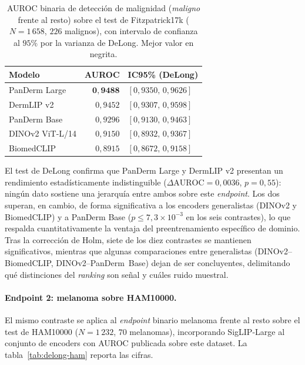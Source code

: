 \begin{table}[htbp]
\centering
\footnotesize
\setlength{\tabcolsep}{4pt}
\renewcommand{\arraystretch}{0.95}
\caption{AUROC binaria de detección de malignidad (\emph{maligno}
frente al resto) sobre el test de Fitzpatrick17k
($N = 1\,658$, $226$ malignos), con intervalo de confianza al
$95\%$ por la varianza de DeLong. Mejor valor en negrita.}
\label{tab:delong-auroc}
\begin{tabular}{lrl}
\hline
Modelo            & AUROC               & IC95\% (DeLong) \\
\hline
PanDerm Large     & $\mathbf{0{,}9488}$ & $[0{,}9350,\, 0{,}9626]$ \\
DermLIP v2        & $0{,}9452$          & $[0{,}9307,\, 0{,}9598]$ \\
PanDerm Base      & $0{,}9296$          & $[0{,}9130,\, 0{,}9463]$ \\
DINOv2 ViT-L/14   & $0{,}9150$          & $[0{,}8932,\, 0{,}9367]$ \\
BiomedCLIP        & $0{,}8915$          & $[0{,}8672,\, 0{,}9158]$ \\
\hline
\end{tabular}
\end{table}

El test de DeLong confirma que PanDerm Large y DermLIP v2 presentan un
rendimiento estadísticamente indistinguible
($\Delta\mathrm{AUROC} = 0{,}0036$, $p = 0{,}55$): ningún dato sostiene
una jerarquía entre ambos sobre este \emph{endpoint}. Los dos superan,
en cambio, de forma significativa a los encoders generalistas (DINOv2
y BiomedCLIP) y a PanDerm Base ($p \leq 7{,}3\times 10^{-3}$ en los
seis contrastes), lo que respalda cuantitativamente la ventaja del
preentrenamiento específico de dominio. Tras la corrección de Holm,
siete de los diez contrastes se mantienen significativos, mientras que
algunas comparaciones entre generalistas (DINOv2--BiomedCLIP,
DINOv2--PanDerm~Base) dejan de ser concluyentes, delimitando qué
distinciones del \emph{ranking} son señal y cuáles ruido muestral.

\paragraph{Endpoint 2: melanoma sobre HAM10000.}
El mismo contraste se aplica al \emph{endpoint} binario melanoma frente
al resto sobre el test de HAM10000 ($N = 1\,232$, $70$ melanomas),
incorporando SigLIP-Large al conjunto de encoders con AUROC
publicada sobre este dataset. La tabla~\ref{tab:delong-ham} reporta las
cifras.

